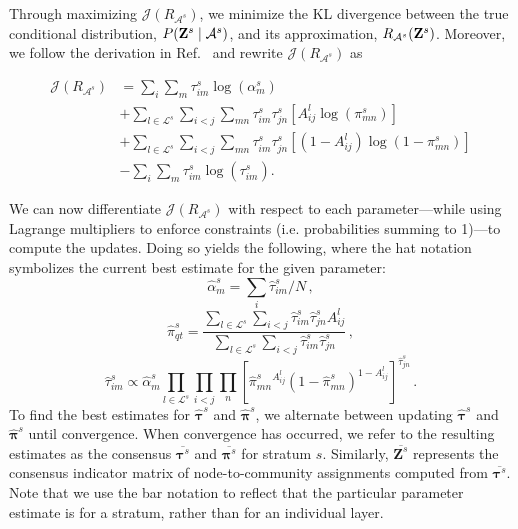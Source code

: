 Through maximizing $\mathcal{J}(R_{\mathcal{A}^{s}})$, we minimize the KL divergence between the true conditional distribution, $P({\bf Z}^{s}\mid \mathcal{A}^{s})$, and its approximation, $R_{\mathcal{A}^{s}}({\bf Z}^{s})$. Moreover, we follow the derivation in Ref.~\cite{Dudin} and rewrite $\mathcal{J}(R_{\mathcal{A}^{s}})$ as

\begin{equation}
\begin{split}
\mathcal{J}(R_{{\mathcal{A}^{s}}})&=\sum_{i}\sum_{m}\tau^{s}_{im}\log(\alpha^{s}_{m})\\
&+\sum_{l \in \mathcal{L}^{s}}\sum_{i<j}\sum_{mn}\tau^{s}_{im}\tau^{s}_{jn}[A^{l}_{ij}\log({ \pi}^{s}_{mn})]\\
&+\sum_{l \in \mathcal{L}^{s}}\sum_{i<j}\sum_{mn}\tau^{s}_{im}\tau^{s}_{jn}[(1-A^{l}_{ij})\log(1-{ \pi}^{s}_{mn})]\\
&-\sum_{i}\sum_{m}\tau^{s}_{im}\log(\tau^{s}_{im}).\
\end{split}
\end{equation}

We can now differentiate $\mathcal{J}(R_{{\mathcal{A}^{s}}})$ with respect to each parameter---while using Lagrange multipliers to enforce constraints (i.e. probabilities summing to 1)---to compute the updates. Doing so yields the following, where the hat notation symbolizes the current best estimate for the given parameter:
%
\begin{equation}
\hat{{{\alpha}}}^{s}_{m}=\sum_{i}\hat{\tau}^{s}_{im}/N \,,
\end{equation}
%
\begin{equation}
\hat{\pi}^{s}_{qt}=\frac{\sum_{l \in \mathcal{L}^{s}}\sum_{i<j}\hat{\tau}^{s}_{im}\hat{\tau}^{s}_{jn}A^{l}_{ij}}{\sum_{l \in \mathcal{L}^{s}}\sum_{i<j}\hat{\tau}^{s}_{im}\hat{\tau}^{s}_{jn}}\,,
\end{equation}
%
\begin{equation}
{\hat{\tau}}^{s}_{im} \propto  \hat{\alpha}^{s}_{m} \prod_{l \in \mathcal{L}^{s}}\prod_{i<j}\prod_{n}[{\hat{\pi}}_{mn}^{s}{^{A^{l}_{ij}}}(1-{\hat{\pi}}^{s}_{mn})^{1-A^{l}_{ij}}]^{\hat{\tau}^{s}_{jn}} \,.
\end{equation}
%
To find the best estimates for $\hat{{\boldsymbol{\tau}}}^{s}$ and $\hat{{\boldsymbol{\pi}}}^{s}$, we alternate between updating $\hat{{\boldsymbol{\tau}}}^{s}$ and $\hat{{\boldsymbol{\pi}}}^{s}$ until convergence. When convergence has occurred, we refer to the resulting estimates as the consensus $\overline{{\boldsymbol \tau}^{s}}$ and $\overline{{\boldsymbol \pi}^{s}}$ for stratum $s$. Similarly, $\overline{{\boldsymbol Z}^{s}}$ represents the consensus indicator matrix of node-to-community assignments computed from $\overline{{\boldsymbol \tau}^{s}}$. Note that we use the bar notation to reflect that the particular parameter estimate is for a stratum, rather than for an individual layer. 

